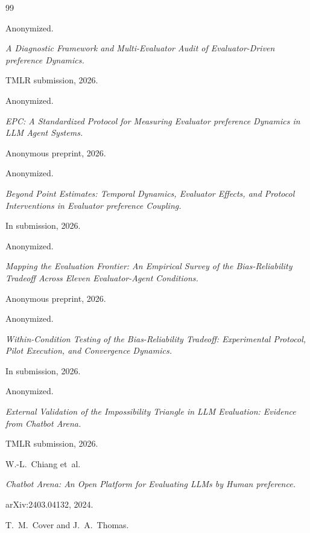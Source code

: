 \documentclass[11pt]{article}
\begin{document}

\begin{thebibliography}{99}

 Anonymized.

\newblock \textit{A Diagnostic Framework and Multi-Evaluator Audit of Evaluator-Driven preference Dynamics.}

\newblock TMLR submission, 2026.

 Anonymized.

\newblock \textit{EPC: A Standardized Protocol for Measuring Evaluator preference Dynamics in LLM Agent Systems.}

\newblock Anonymous preprint, 2026.

 Anonymized.

\newblock \textit{Beyond Point Estimates: Temporal Dynamics, Evaluator Effects, and Protocol Interventions in Evaluator preference Coupling.}

\newblock In submission, 2026.

 Anonymized.

\newblock \textit{Mapping the Evaluation Frontier: An Empirical Survey of the Bias-Reliability Tradeoff Across Eleven Evaluator-Agent Conditions.}

\newblock Anonymous preprint, 2026.

 Anonymized.

\newblock \textit{Within-Condition Testing of the Bias-Reliability Tradeoff: Experimental Protocol, Pilot Execution, and Convergence Dynamics.}

\newblock In submission, 2026.

 Anonymized.

\newblock \textit{External Validation of the Impossibility Triangle in LLM Evaluation: Evidence from Chatbot Arena.}

\newblock TMLR submission, 2026.

 W.-L.~Chiang et~al.

\newblock \textit{Chatbot Arena: An Open Platform for Evaluating LLMs by Human preference.}

\newblock arXiv:2403.04132, 2024.

 T.~M.~Cover and J.~A.~Thomas.


\end{thebibliography}
\end{document}
